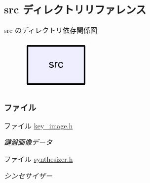 \subsection{src ディレクトリリファレンス}
\label{dir_68267d1309a1af8e8297ef4c3efbcdba}
src のディレクトリ依存関係図\nopagebreak
\begin{figure}[H]
\begin{center}
\leavevmode
\includegraphics[width=98pt]{dir_68267d1309a1af8e8297ef4c3efbcdba_dep}
\end{center}
\end{figure}
\subsubsection*{ファイル}
\begin{DoxyCompactItemize}
\item 
ファイル \hyperlink{key__image_8h}{key\+\_\+image.\+h}
\begin{DoxyCompactList}\small\item\em 鍵盤画像データ \end{DoxyCompactList}\item 
ファイル \hyperlink{synthesizer_8h}{synthesizer.\+h}
\begin{DoxyCompactList}\small\item\em シンセサイザー \end{DoxyCompactList}\end{DoxyCompactItemize}
